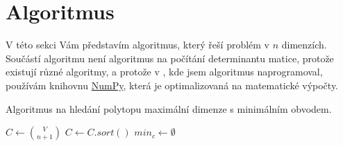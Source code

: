 \section{Algoritmus}
V této sekci Vám představím algoritmus, který řeší problém v $n$ dimenzích. Součástí algoritmu není algoritmus na počítání determinantu matice, protože existují různé algoritmy, a protože v , kde jsem algoritmus naprogramoval, používám knihovnu \href{https://numpy.org/doc/stable/index.html}{NumPy}, která je optimalizovaná na matematické výpočty. 


\begin{algorithm}[H]
    \caption{Algoritmus na hledání polytopu maximální dimenze s minimálním obvodem.}
    \label{alg:algoritmus_nd}


    \BlankLine
    $C \leftarrow \binom{V}{n+1}$\;
    $C \leftarrow C.sort()$\; %
    $min_c \leftarrow \emptyset$\;
    \;
   \end{algorithm}